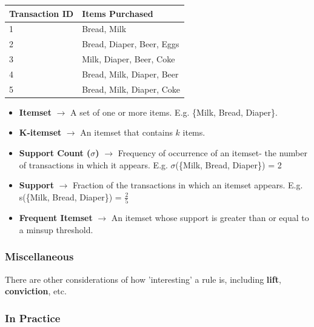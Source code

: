 \documentclass[english, 10pt]{article}
\begin{document}
{
\centering

\begin{table}[]
\begin{tabular}{|l|l|}
\hline
\textbf{Transaction ID} & \textbf{Items Purchased}  \\ \hline
1                       & Bread, Milk               \\ \hline
2                       & Bread, Diaper, Beer, Eggs \\ \hline
3                       & Milk, Diaper, Beer, Coke  \\ \hline
4                       & Bread, Milk, Diaper, Beer \\ \hline
5                       & Bread, Milk, Diaper, Coke \\ \hline
\end{tabular}
\end{table}

}



\begin{itemize}
	\item \textbf{Itemset} $\rightarrow$ A set of one or more items. E.g. \{Milk, Bread, Diaper\}. 
	\item \textbf{K-itemset} $\rightarrow$ An itemset that contains $k$ items.
	\item \textbf{Support Count ($\sigma$)} $\rightarrow$ Frequency of occurrence of an itemset- the number of transactions in which it appears. E.g. $\sigma$(\{Milk, Bread, Diaper\}) = 2
	\item \textbf{Support} $\rightarrow$ Fraction of the transactions in which an itemset appears. E.g. s(\{Milk, Bread, Diaper\}) = $\frac{2}{5}$
	\item \textbf{Frequent Itemset} $\rightarrow$ An itemset whose support is greater than or equal to a minsup threshold.
\end{itemize}

\subsubsection{Miscellaneous}

There are other considerations of how 'interesting' a rule is, including \textbf{lift}, \textbf{conviction}, etc. 

\subsubsection{In Practice}
\end{document}

